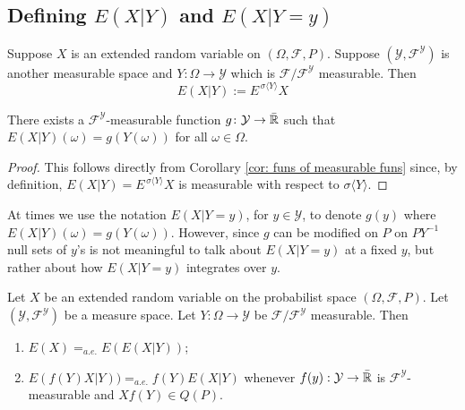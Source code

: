 \subsection{Defining $E(X|Y)$ and $E(X|Y=y)$}


\begin{definition}
Suppose $X$ is an extended random variable on $(\Omega, \mathcal F, P)$. Suppose $(\mathcal Y, \mathcal F^{\mathcal Y})$ is another measurable space and
$Y:\Omega \rightarrow \mathcal Y$ which is $\mathcal F/\mathcal F^{\mathcal Y}$ measurable. Then
\[
E(X|Y) := E^{\,\sigma\langle Y \rangle} X
\]
\end{definition}

\begin{corollary}[{\bf $E(X|Y)$ is a function of $Y$}]
There exists a $\mathcal F^{\mathcal Y}$-measurable function $g\colon \mathcal Y \rightarrow \bar{\Bbb R}$ such that $E(X|Y)(\omega) = g(Y(\omega))$ for all $\omega \in \Omega$.
\end{corollary}
\begin{proof}
This follows directly from Corollary \ref{cor: funs of measurable funs} since, by definition, $E(X|Y) = E^{\,\sigma\langle Y \rangle} X$ is measurable with respect to $\sigma\langle Y \rangle$.
\end{proof}


At times we use the notation $E(X|Y=y)$, for $y\in \mathcal Y$, to denote $g(y)$ where $E(X|Y)(\omega) = g(Y(\omega))$. However, since $g$ can be modified on $P$ on $PY^{-1}$ null sets of $y$'s is not meaningful to talk about $E(X|Y=y)$ at a fixed $y$, but rather about how $E(X|Y=y)$ integrates over $y$.



\begin{corollary}
Let $X$ be an  extended random variable on the probabilist space $(\Omega, \mathcal F, P)$. Let $(\mathcal Y, \mathcal F^{\mathcal Y})$ be a measure space. Let $Y:\Omega \rightarrow \mathcal Y$ be $\mathcal F/\mathcal F^{\mathcal Y}$ measurable. Then
\begin{enumerate}
\item ${E(X) =_{a.e.} E(E(X|Y))}$;
\item ${E(f(Y)X|Y)) =_{a.e.} f(Y)E(X|Y)}$ whenever $f(y): \mathcal Y \rightarrow \bar{\Bbb R}$ is $\mathcal F^{\mathcal Y}$-measurable and $Xf(Y)\in Q(P)$.
\end{enumerate}
\end{corollary}



